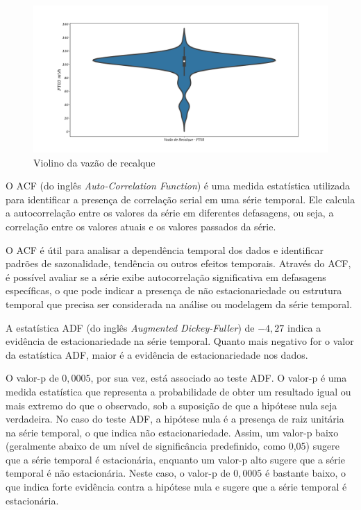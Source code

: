 	
	\begin{figure}[H]
		\centering
		\caption{Violino da vazão de recalque}
		\label{fig:ft03}
		\includegraphics[width=0.9\linewidth]{Resultados/Figuras/ft03}
		
	\end{figure}


O ACF (do inglês \textit{Auto-Correlation Function}) é uma medida estatística utilizada para identificar a presença de correlação serial em uma série temporal. Ele calcula a autocorrelação entre os valores da série em diferentes defasagens, ou seja, a correlação entre os valores atuais e os valores passados da série. 

O ACF é útil para analisar a dependência temporal dos dados e identificar padrões de sazonalidade, tendência ou outros efeitos temporais. Através do ACF, é possível avaliar se a série exibe autocorrelação significativa em defasagens específicas, o que pode indicar a presença de não estacionariedade ou estrutura temporal que precisa ser considerada na análise ou modelagem da série temporal.

A estatística ADF (do inglês \textit{Augmented Dickey-Fuller}) de $-4,27$ indica a evidência de estacionariedade na série temporal. Quanto mais negativo for o valor da estatística ADF, maior é a evidência de estacionariedade nos dados.

O valor-p de $0,0005$, por sua vez, está associado ao teste ADF. O valor-p é uma medida estatística que representa a probabilidade de obter um resultado igual ou mais extremo do que o observado, sob a suposição de que a hipótese nula seja verdadeira. No caso do teste ADF, a hipótese nula é a presença de raiz unitária na série temporal, o que indica não estacionariedade. Assim, um valor-p baixo (geralmente abaixo de um nível de significância predefinido, como 0,05) sugere que a série temporal é estacionária, enquanto um valor-p alto sugere que a série temporal é não estacionária. Neste caso, o valor-p de $0,0005$ é bastante baixo, o que indica forte evidência contra a hipótese nula e sugere que a série temporal é estacionária.

